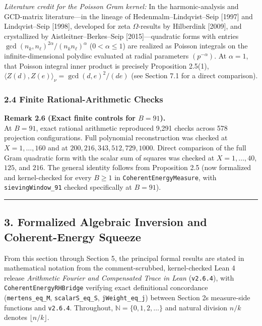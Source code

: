 \documentclass[11pt]{article}
\begin{document}
\emph{Literature credit for the Poisson Gram kernel:} In the harmonic-analysis and GCD-matrix literature---in the lineage of Hedenmalm--Lindqvist--Seip {[}1997{]} and Lindqvist--Seip {[}1998{]}, developed for zeta \(\Omega\)-results by Hilberdink {[}2009{]}, and crystallized by Aistleitner--Berkes--Seip {[}2015{]}---quadratic forms with entries \(\gcd(n_k, n_\ell)^{2\alpha}/(n_k n_\ell)^\alpha\) (\(0 < \alpha \le 1\)) are realized as Poisson integrals on the infinite-dimensional polydisc evaluated at radial parameters \((p^{-\alpha})\). At \(\alpha = 1\), that Poisson integral inner product is precisely Proposition 2.5(1), \(\langle Z(d), Z(e)\rangle_\nu = \gcd(d, e)^2 / (de)\) (see Section 7.1 for a direct comparison).

\subsubsection{2.4 Finite Rational-Arithmetic Checks}\label{24-finite-rational-arithmetic-checks}

\textbf{Remark 2.6 (Exact finite controls for \(B = 91\)).}\\
At \(B=91\), exact rational arithmetic reproduced 9,291 checks across 578 projection configurations. Full polynomial reconstruction was checked at \(X=1,\ldots,160\) and at \(200,216,343,512,729,1000\). Direct comparison of the full Gram quadratic form with the scalar sum of squares was checked at \(X=1,\ldots,40\), \(125\), and \(216\). The general identity follows from Proposition 2.5 (now formalized and kernel-checked for every \(B \ge 1\) in \texttt{CoherentEnergyMeasure}, with \texttt{sievingWindow\_91} checked specifically at \(B = 91\)).

\begin{center}\rule{0.5\linewidth}{0.5pt}\end{center}

\subsection{3. Formalized Algebraic Inversion and Coherent-Energy Squeeze}\label{3-formalized-algebraic-inversion-and-coherent-energy-squeeze}

From this section through Section 5, the principal formal results are stated in mathematical notation from the comment-scrubbed, kernel-checked Lean 4 release \emph{Arithmetic Fourier and Compensated Trace in Lean} (\texttt{v2.6.4}), with \texttt{CoherentEnergyRHBridge} verifying exact definitional concordance (\texttt{mertens\_eq\_M}, \texttt{scalarS\_eq\_S}, \texttt{jWeight\_eq\_j}) between Section 2\textquotesingle s measure-side functions and \texttt{v2.6.4}. Throughout, \(\mathbb{N} = \{0, 1, 2, \dots\}\) and natural division \(n / k\) denotes \(\lfloor n / k \rfloor\).
\end{document}
